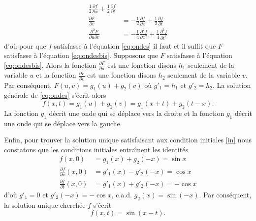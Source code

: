 {{\begin{align*}
\frac 12\frac{\partial f}{\partial x}+\frac 12\frac{\partial f}{\partial t}
\\
\frac{\partial F}{\partial v}&= 
-\frac 12\frac{\partial f}{\partial x}+\frac 12\frac{\partial f}{\partial t}
\\
\frac{\partial^2 F}{\partial u \partial v}&= 
-\frac 14\frac{\partial^2 f}{\partial x^2}
+\frac 14\frac{\partial^2 f}{\partial t^2}
\end{align*}
d'o\`u pour que $f$ satisfasse \`a l'\'equation \eqref{eq:ondes} il faut et il suffit que $F$ satisfasse \`a l'\'equation
 \eqref{eq:ondesbis}.
Supposons que $F$ satisfasse \`a l'\'equation \eqref{eq:ondesbis}.
Alors la fonction $\frac{\partial F}{\partial u}$ est une fonction
disons $h_1$ seulement de la variable $u$
et la fonction $\frac{\partial F}{\partial v}$ est une fonction
disons $h_2$ seulement de la variable $v$.
Par cons\'equent,
$F(u,v)= g_1(u)+g_2(v)$ o\`u $g'_1=h_1$ et $g'_2=h_2$.
La solution g\'en\'erale de
\eqref{eq:ondes} s'\'ecrit alors
\[
f(x,t)=g_1(u)+g_2(v)=g_1(x+t)+g_2(t-x) .
\]
La fonction $g_1$ d\'ecrit
une onde qui se d\'eplace vers la droite et 
la fonction $g_1$ d\'ecrit
une onde qui se d\'eplace vers la gauche.

Enfin, pour trouver la solution unique
satisfaisant aux condition initiales \eqref{in} nous constatons que
les conditions initiales entra\^ \i nent les identit\'es
\begin{align*}
f(x,0)&=g_1(x)+g_2(-x)=\sin x
\\
\frac {\partial f}{\partial x}(x,0)&=g'_1(x)-g'_2(-x)=\cos x
\\
\frac {\partial f}{\partial t}(x,0)&=g'_1(x)+g'_2(-x)=-\cos x
\end{align*}
d'o\`u $g'_1=0$ et $g'_2(-x)=-\cos x$, c.a.d. 
$g_2(x)=\sin (-x)$. Par cons\'equent,
la solution unique cherch\'ee $f$ s'\'ecrit
\[
f(x,t)= \sin(x-t).
\]
}
}
